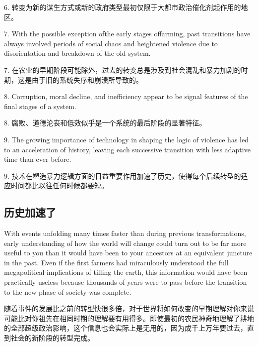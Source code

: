 \begin{Parallel}{97mm}{45mm}
  \ParallelRText
  {6. 转变为新的谋生方式或新的政府类型最初仅限于大都市政治催化剂起作用的地区。}
  \ParallelPar



  \ParallelLText
  {7. With the possible exception ofthe early stages offarming, past transitions have always involved periods of social chaos and heightened violence due to disorientation and breakdown of the old system.}
  
  \ParallelRText
  {7. 在农业的早期阶段可能除外，过去的转变总是涉及到社会混乱和暴力加剧的时期，这是由于旧的系统失序和崩溃所导致的。}
  \ParallelPar



  \ParallelLText
  {8. Corruption, moral decline, and inefficiency appear to be signal features of the final stages of a system.}
  
  \ParallelRText
  {8. 腐败、道德沦丧和低效似乎是一个系统的最后阶段的显著特征。}
  \ParallelPar



  \ParallelLText
  {9. The growing importance of technology in shaping the logic of violence has led to an acceleration of history, leaving each successive transition with less adaptive time than ever before.}
  
  \ParallelRText
  {9. 技术在塑造暴力逻辑方面的日益重要作用加速了历史，使得每个后续转型的适应时间都比以往任何时候都要短。}
  \ParallelPar

  \subsection{历史加速了}

  \ParallelLText
  {With events unfolding many times faster than during previous transformations, early understanding of how the world will change could turn out to be far more useful to you than it would have been to your ancestors at an equivalent juncture in the past. Even if the first farmers had miraculously understood the full megapolitical implications of tilling the earth, this information would have been practically useless because thousands of years were to pass before the transition to the new phase of society was complete.}
  
  \ParallelRText
  {随着事件的发展比之前的转型快很多倍，对于世界将如何改变的早期理解对你来说可能比对你祖先在相同时期的理解要有用得多。即使最初的农民神奇地理解了耕地的全部超级政治影响，这个信息也会实际上是无用的，因为成千上万年要过去，直到社会的新阶段的转型完成。}
  \ParallelPar



\end{Parallel}
